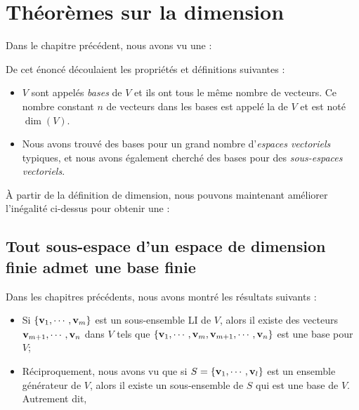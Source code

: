 \chapter{ Th\'eor\`emes sur la dimension}
\label{chapter:Fr_11-dimensiontheorems}

Dans le chapitre précédent, nous avons vu une  :


De cet énoncé découlaient les propriétés et définitions suivantes : 
\begin{itemize}
	\item  {}  $V$
sont appelés \emph{bases} de $V$ et ils ont tous le même nombre de vecteurs. Ce nombre constant $n$ de vecteurs dans
les bases est appelé la  de $V$ et est noté $\dim(V)$.
	\item Nous avons trouvé des bases pour un grand nombre d'\emph{espaces vectoriels} typiques, et nous avons également cherché des bases pour des \emph{sous-espaces vectoriels}.\\
\end{itemize} 






À partir de la définition de dimension, nous pouvons maintenant améliorer l'inégalité ci-dessus pour obtenir une  :



\section{Tout sous-espace d'un espace de dimension finie admet une base finie}

Dans les chapitres précédents, nous avons montré les r\'esultats suivants :
\begin{itemize}
\item Si $\{\mathbf{v}_1, \cdots, \mathbf{v}_m\}$ est un sous-ensemble LI de $V$, alors il existe
des vecteurs $\mathbf{v}_{m+1}, \cdots, \mathbf{v}_n$ dans $V$ tels que $\{\mathbf{v}_1, \cdots, \mathbf{v}_m, \mathbf{v}_{m+1}, \cdots, \mathbf{v}_n\}$ est une base pour $V$; 
\item Réciproquement, nous avons vu que si $S = \{\mathbf{v}_1, \cdots, \mathbf{v}_l\}$ est un ensemble gén\'erateur de $V$, alors il existe un sous-ensemble de $S$ qui est une base de $V$. Autrement dit, 
\end{itemize}

